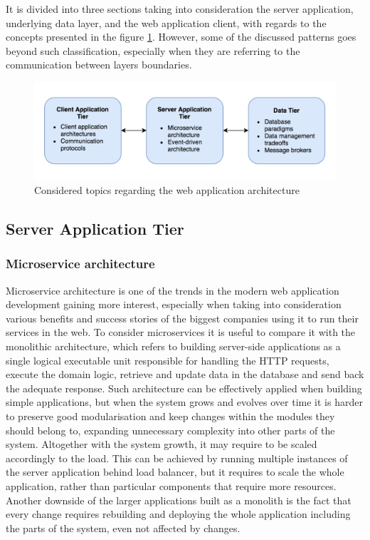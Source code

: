 It is divided into three sections taking into consideration the server application, underlying data layer, and the web application client, with regards to the concepts presented in the figure \ref{fig:web-app-architecture-concepts}. However, some of the discussed patterns goes beyond such classification, especially when they are referring to the communication between layers boundaries.

\begin{figure}[h]
    \centering
    \includegraphics[width=1\textwidth]{assets/03-web-applications/WebAppLayers.png}
    \caption{Considered topics regarding the web application architecture}
    \label{fig:web-app-architecture-concepts}
\end{figure}

\subsection{Server Application Tier}

\subsubsection{Microservice architecture}

Microservice architecture is one of the trends in the modern web application development gaining more interest, especially when taking into consideration various benefits and success stories of the biggest companies using it to run their services in the web. To consider microservices it is useful to compare it with the monolithic architecture, which refers to building server-side applications as a single logical executable unit responsible for handling the HTTP requests, execute the domain logic, retrieve and update data in the database and send back the adequate response. Such architecture can be effectively applied when building simple applications, but when the system grows and evolves over time it is harder to preserve good modularisation and keep changes within the modules they should belong to, expanding unnecessary complexity into other parts of the system. Altogether with the system growth, it may require to be scaled accordingly to the load. This can be achieved by running multiple instances of the server application behind load balancer, but it requires to scale the whole application, rather than particular components that require more resources. Another downside of the larger applications built as a monolith is the fact that every change requires rebuilding and deploying the whole application including the parts of the system, even not affected by changes.

